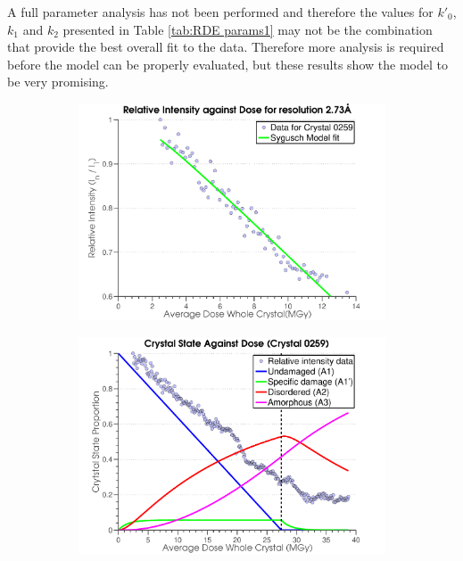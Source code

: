 A full parameter analysis has not been performed and therefore the values for $k'_0$, $k_1$ and $k_2$ presented in Table \ref{tab:RDE params1} may not be the combination that provide the best overall fit to the data.
Therefore more analysis is required before the model can be properly evaluated, but these results show the model to be very promising.
\begin{figure}
        \centering
        \begin{subfigure}[b]{0.825\textwidth}
                \centering
                \includegraphics[width=\textwidth]{figures/dwd/syguschfit.pdf}
                \caption{}
                \label{figfitfial}
        \end{subfigure}
				\qquad
        \begin{subfigure}[b]{0.825\textwidth}
                \centering
                \includegraphics[width=\textwidth]{figures/dwd/crystalstates.pdf}

\end{subfigure}
\end{figure}
